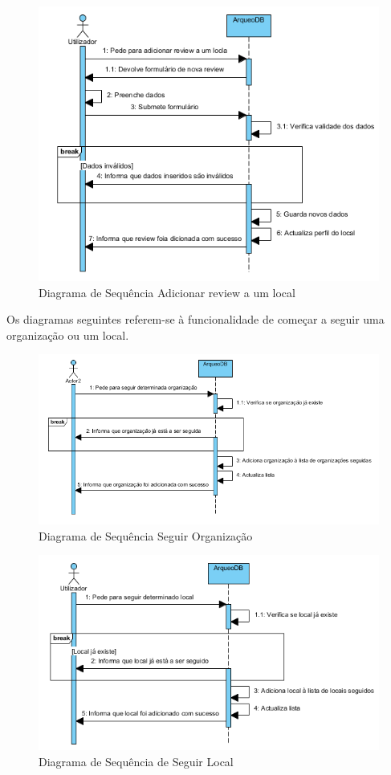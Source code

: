 ﻿\documentclass[12pt,a4paper]{article}
\begin{document}
\begin{figure}[h!]
\centering
\includegraphics[scale=1]{sequencia/adicionarreview}
\caption{Diagrama de Sequência Adicionar review a um local} 
\end{figure}

\clearpage
Os diagramas seguintes referem-se à funcionalidade de começar a seguir uma organização ou um local.\\

\begin{figure}[h!]
\centering
\includegraphics[scale=0.8]{sequencia/seguirorganizacao}
\caption{Diagrama de Sequência Seguir Organização} 
\end{figure}

\begin{figure}[h!]
\centering
\includegraphics[scale=0.8]{sequencia/seguirlocal}
\caption{Diagrama de Sequência de Seguir Local} 
\end{figure}
\end{document}
